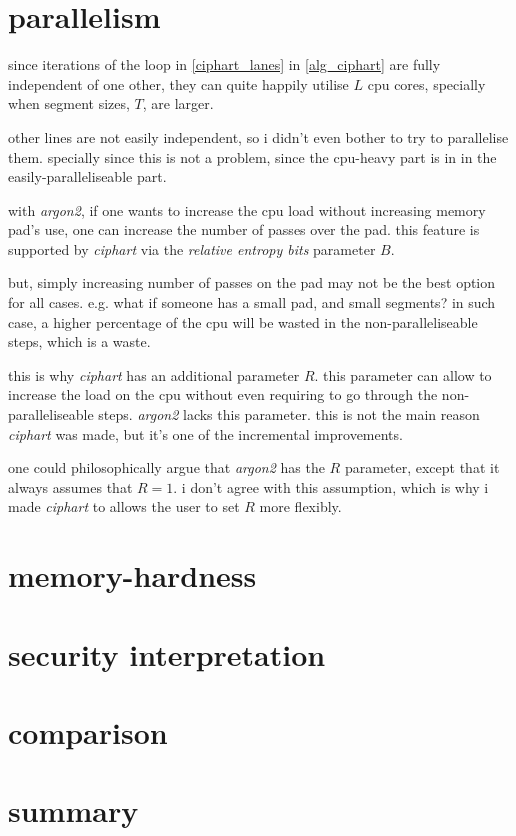\documentclass[twocolumn]{article}
\begin{document}
\section{parallelism}
since iterations of the loop in \cref{ciphart_lanes} in \cref{alg_ciphart}
are fully independent of one other, they can quite happily utilise $L$ cpu
cores, specially when segment sizes, $T$, are larger.

other lines are not easily independent, so i didn't even bother to try to
parallelise them.  specially since this is not a problem, since the
cpu-heavy part is in in the easily-paralleliseable  part.

with \emph{argon2}, if one wants to increase the cpu load without
increasing memory pad's use, one can increase the number of passes over the
pad.  this feature is supported by \emph{ciphart} via the \emph{relative
entropy bits} parameter $B$.

but, simply increasing number of passes on the pad may not be the best
option for all cases.  e.g. what if someone has a small pad, and small
segments?  in such case, a higher percentage of the cpu will be wasted in
the non-paralleliseable steps, which is a waste.

this is why \emph{ciphart} has an additional parameter $R$.  this parameter
can allow to increase the load on the cpu without even requiring to go
through the non-paralleliseable steps.  \emph{argon2} lacks this parameter.
this is not the main reason \emph{ciphart} was made, but it's one of the
incremental improvements.

one could philosophically argue that \emph{argon2} has the $R$ parameter,
except that it always assumes that $R=1$.  i don't agree with this
assumption, which is why i made \emph{ciphart} to allows the user to set
$R$ more flexibly.

\section{memory-hardness}
\section{security interpretation}
\section{comparison}
\section{summary}
\end{document}
